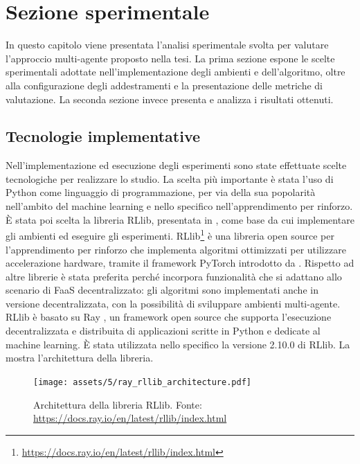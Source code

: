 \chapter{Sezione sperimentale}
\label{sec:5_esperimenti}

In questo capitolo viene presentata l'analisi sperimentale svolta per valutare l'approccio multi-agente proposto nella tesi. La prima sezione espone le scelte sperimentali adottate nell'implementazione degli ambienti e dell'algoritmo, oltre alla configurazione degli addestramenti e la presentazione delle metriche di valutazione. La seconda sezione invece presenta e analizza i risultati ottenuti.

\section{Tecnologie implementative}

Nell'implementazione ed esecuzione degli esperimenti sono state effettuate scelte tecnologiche per realizzare lo studio. La scelta più importante è stata l'uso di Python come linguaggio di programmazione, per via della sua popolarità nell'ambito del machine learning e nello specifico nell'apprendimento per rinforzo. È stata poi scelta la libreria RLlib, presentata in \cite{Liang2018}, come base da cui implementare gli ambienti ed eseguire gli esperimenti. RLlib\footnote{\url{https://docs.ray.io/en/latest/rllib/index.html}} è una libreria open source per l'apprendimento per rinforzo che implementa algoritmi ottimizzati per utilizzare accelerazione hardware, tramite il framework PyTorch introdotto da \cite{Ansel2024}. Rispetto ad altre librerie è stata preferita perché incorpora funzionalità che si adattano
allo scenario di FaaS decentralizzato: gli algoritmi sono implementati anche in versione decentralizzata, con la possibilità di sviluppare ambienti multi-agente. RLlib è basato su Ray \cite{Moritz2018}, un framework open source che supporta l'esecuzione decentralizzata e distribuita di applicazioni scritte in Python e dedicate al machine learning. È stata utilizzata nello specifico la versione 2.10.0 di RLlib. La  mostra l'architettura della libreria.

\begin{figure}[ht]
    \centering
    \texttt{[image: assets/5/ray\_rllib\_architecture.pdf]}
    \caption[Architettura della libreria RLlib]{Architettura della libreria RLlib. Fonte: \url{https://docs.ray.io/en/latest/rllib/index.html}}
    \label{fig:5_ray_rllib_architecture}
\end{figure}

